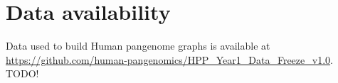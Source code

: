 \documentclass{bioinfo}
\begin{document}
\section*{Data availability}

Data used to build Human pangenome graphs is available at \url{https://github.com/human-pangenomics/HPP_Year1_Data_Freeze_v1.0}.
TODO!


%
%
%
%
%
%
%











\end{document}
